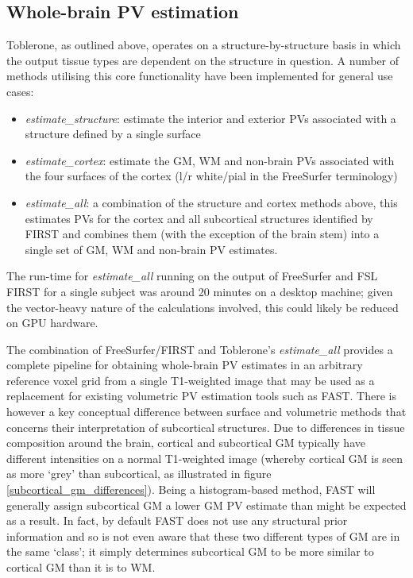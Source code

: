 \subsection{Whole-brain PV estimation}
Toblerone, as outlined above, operates on a structure-by-structure basis in which the output tissue types are dependent on the structure in question. A number of methods utilising this core functionality have been implemented for general use cases: 
\begin{itemize}
	\item \textit{estimate\_structure}: estimate the interior and exterior PVs associated with a structure defined by a single surface
	\item \textit{estimate\_cortex}: estimate the GM, WM and non-brain PVs associated with the four surfaces of the cortex (l/r white/pial in the FreeSurfer terminology) 
	\item \textit{estimate\_all}: a combination of the structure and cortex methods above, this estimates PVs for the cortex and all subcortical structures identified by FIRST and combines them (with the exception of the brain stem) into a single set of GM, WM and non-brain PV estimates. 
\end{itemize}
The run-time for \textit{estimate\_all} running on the output of FreeSurfer and FSL FIRST for a single subject was around 20 minutes on a desktop machine; given the vector-heavy nature of the calculations involved, this could likely be reduced on GPU hardware. 
	
The combination of FreeSurfer/FIRST and Toblerone's \textit{estimate\_all} provides a complete pipeline for obtaining whole-brain PV estimates in an arbitrary reference voxel grid from a single T1-weighted image that may be used as a replacement for existing volumetric PV estimation tools such as FAST. There is however a key conceptual difference between surface and volumetric methods that concerns their interpretation of subcortical structures. Due to differences in tissue composition around the brain, cortical and subcortical GM typically have different intensities on a normal T1-weighted image (whereby cortical GM is seen as more ‘grey’ than subcortical, as illustrated in figure \ref{subcortical_gm_differences}). Being a histogram-based method, FAST will generally assign subcortical GM a lower GM PV estimate than might be expected as a result. In fact, by default FAST does not use any structural prior information and so is not even aware that these two different types of GM are in the same `class'; it simply determines subcortical GM to be more similar to cortical GM than it is to WM. 

